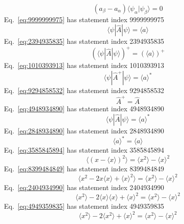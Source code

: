 \documentclass[12pt]{report}
\newcommand{\bra}[1]{\langle #1 |}
\newcommand{\ket}[1]{| #1\rangle}
\newcommand{\braket}[2]{\langle #1 | #2 \rangle}
\begin{document}
\begin{equation}
( a_{\beta} - a_{\alpha} ) \braket{\psi_{\alpha}}{\psi_{\beta}} = 0
\label{eq:2394935831}
\end{equation}
Eq.~\ref{eq:9999999975} has statement index 9999999975
\begin{equation}
\bra{\psi} \hat{A} \ket{\psi} = \langle a \rangle
\label{eq:9999999975}
\end{equation}
Eq.~\ref{eq:2394935835} has statement index 2394935835
\begin{equation}
\left(\bra{\psi} \hat{A} \ket{\psi} \right)^+= \left(\langle a \rangle\right)^+
\label{eq:2394935835}
\end{equation}
Eq.~\ref{eq:1010393913} has statement index 1010393913
\begin{equation}
\bra{\psi} \hat{A}^+ \ket{\psi}=\langle a \rangle^*
\label{eq:1010393913}
\end{equation}
Eq.~\ref{eq:9294858532} has statement index 9294858532
\begin{equation}
\hat{A}^+=\hat{A}
\label{eq:9294858532}
\end{equation}
Eq.~\ref{eq:4948934890} has statement index 4948934890
\begin{equation}
\bra{\psi} \hat{A} \ket{\psi}=\langle a \rangle^*
\label{eq:4948934890}
\end{equation}
Eq.~\ref{eq:2848934890} has statement index 2848934890
\begin{equation}
\langle a \rangle^*=\langle a \rangle
\label{eq:2848934890}
\end{equation}
Eq.~\ref{eq:3585845894} has statement index 3585845894
\begin{equation}
\langle \left(x-\langle x \rangle\right)^2 \rangle=\langle x^2 \rangle-\langle x \rangle^2
\label{eq:3585845894}
\end{equation}
Eq.~\ref{eq:8399484849} has statement index 8399484849
\begin{equation}
\langle x^2 -2x\langle x \rangle+\langle x \rangle^2 \rangle=\langle x^2 \rangle-\langle x \rangle^2
\label{eq:8399484849}
\end{equation}
Eq.~\ref{eq:2404934990} has statement index 2404934990
\begin{equation}
\langle x^2\rangle -2\langle x \rangle\langle x \rangle+\langle x \rangle^2=\langle x^2 \rangle-\langle x \rangle^2
\label{eq:2404934990}
\end{equation}
Eq.~\ref{eq:4949359835} has statement index 4949359835
\begin{equation}
\langle x^2\rangle -2\langle x^2 \rangle+\langle x \rangle^2=\langle x^2 \rangle-\langle x \rangle^2
\label{eq:4949359835}
\end{equation}
\end{document}
